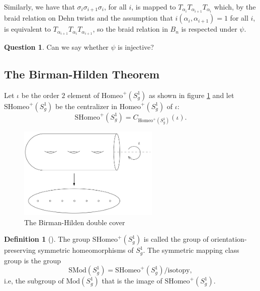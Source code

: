 \documentclass[reqno]{amsart}
\theoremstyle{definition}
\newtheorem{definition}[theorem]{Definition}
\newtheorem{question}[theorem]{Question}
\theoremstyle{remark}
\newcommand{\Mod}{{\mathrm{Mod}}}
\newcommand{\SMod}{{\mathrm{SMod}}}
\newcommand{\Homeo}{{\mathrm{Homeo}}}
\newcommand{\SHomeo}{{\mathrm{SHomeo}}}
\begin{document}
 Similarly, we have that
 $\sigma_i \sigma_{i+1} \sigma_i$, for all $i$,
 is mapped to 
 $T_{\alpha_i} T_{\alpha_{i+1}} T_{\alpha_i}$ which, by the
 braid relation on Dehn twists and the
 assumption that
 $i\left( \alpha_i, \alpha_{i+1} \right) =1$ for all $i$,
 is equivalent to
 $T_{\alpha_{i+1}} T_{\alpha_i}T_{\alpha_{i+1}}$, so
 the braid relation in $B_n$ is respected
 under $\psi $.

 \begin{question}
     Can we say whether $\psi $ is injective?
 \end{question}

 \subsection{The Birman-Hilden Theorem}
Let $\iota$ be the order  $2$ element of
$\Homeo^{+} \left( S_g^{1} \right) $ as
shown in figure \ref{fig:birman-hilden-double-cover-png}
and let $\SHomeo^{+} \left( S_g^{1} \right) $ be
the centralizer in
$\Homeo^{+}\left( S_g^{1} \right) $ of
$\iota$:
\[
\SHomeo^{+} \left( S_g^{1} \right) 
= C_{\Homeo^{+} \left( S_g^{1} \right) }\left( \iota \right) .
\] 

 \begin{figure}[H]
     \centering
     \includegraphics[width=0.6\textwidth]{birman-hilden-double-cover.png}
     \caption{The Birman-Hilden double cover}
     \label{fig:birman-hilden-double-cover-png}
 \end{figure}

 \begin{definition}[]
 The group $\SHomeo^{+} \left( S_g^{1} \right) $ is
 called the group of orientation-preserving
 symmetric homeomorphisms of $S_g^{1}$. 
 The symmetric mapping class group is the group
 \[
 \SMod (S_g^{1}) = 
 \SHomeo^{+} \left( S_g^{1} \right) / \text{isotopy},
 \] 
 i.e, the subgroup of $\Mod \left( S_g^{1} \right) $ that
 is the image of $\SHomeo^{+} \left( S_g^{1} \right) $.
 \end{definition}
\end{document}
